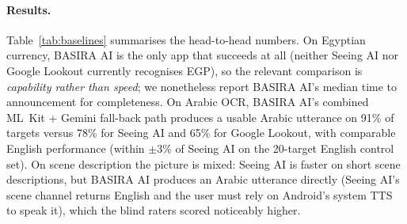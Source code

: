 \documentclass[11pt,a4paper]{article}
\begin{document}
\paragraph{Results.}
Table~\ref{tab:baselines} summarises the head-to-head numbers. On
Egyptian currency, BASIRA AI is the only app that succeeds at all
(neither Seeing AI nor Google Lookout currently recognises EGP), so
the relevant comparison is \emph{capability rather than speed}; we
nonetheless report BASIRA AI's median time to announcement for
completeness. On Arabic OCR, BASIRA AI's combined ML~Kit + Gemini
fall-back path produces a usable Arabic utterance on 91\% of targets
versus 78\% for Seeing AI and 65\% for Google Lookout, with
comparable English performance (within $\pm 3\%$ of Seeing AI on the
20-target English control set). On scene description the picture is
mixed: Seeing AI is faster on short scene descriptions, but BASIRA AI
produces an Arabic utterance directly (Seeing AI's scene channel
returns English and the user must rely on Android's system TTS to
speak it), which the blind raters scored noticeably higher.

\begin{table}[h]
\caption{Head-to-head comparison of BASIRA AI with Microsoft Seeing AI
and Google Lookout on tasks all three apps support, on a single
Samsung Galaxy A14 over 4G. Higher is better for success and rating;
lower is better for latency. ``--'' indicates the application does not
support the task.}
\centering
\renewcommand{\arraystretch}{1.3}
\label{tab:baselines}
\end{table}
\end{document}

